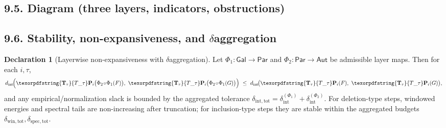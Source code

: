 \documentclass[11pt]{article}
\numberwithin{equation}{section}
\theoremstyle{plain}
\theoremstyle{definition}
\theoremstyle{remark}
\DeclareMathOperator{\Ext}{Ext}
\DeclareRobustCommand{\hyp}{\nobreakdash-}
\newcommand{\Pers}{\mathsf{Pers}}
\newcommand{\Rfun}{\mathcal{R}}
\theoremstyle{plain}
\theoremstyle{definition}
\numberwithin{equation}{section}
\theoremstyle{definition}
\newtheorem{declaration}[theorem]{Declaration}
\DeclareRobustCommand{\Perskft}{\Pers^{\mathrm{cons}}_{k}}
\DeclareRobustCommand{\Ttau}{\texorpdfstring{\ensuremath{\mathbf{T}_{\tau}}}{T\_\tau}}
\DeclareRobustCommand{\Ctau}{\texorpdfstring{\ensuremath{C_{\tau}}}{C\_\tau}}
\DeclareRobustCommand{\muc}{\mu_{\mathrm{Collapse}}}
\DeclareRobustCommand{\nuc}{\nu_{\mathrm{Collapse}}}
\numberwithin{equation}{section}
\theoremstyle{plain}
\theoremstyle{definition}
\theoremstyle{remark}
\providecommand{\Cfun}[1]{\mathsf{C}_{#1}}
\providecommand{\Tfun}[1]{\mathbf{T}_{#1}}
\providecommand{\Ctau}{\Cfun{\tau}}
\providecommand{\Ttau}{\Tfun{\tau}}
\providecommand{\muc}{\mu_{\mathrm{Collapse}}}
\providecommand{\nuc}{\nu_{\mathrm{Collapse}}}
\providecommand{\n}{\unskip\space}
\begin{document}
\subsection*{9.5. Diagram (three layers, indicators, obstructions)}\label{sec:9.5}
\begin{center}
\end{center}

\subsection*{9.6. Stability, non\hyp expansiveness, and \(\delta\)\nobreakdash aggregation}
\begin{declaration}[Layerwise non\hyp expansiveness with \(\delta\)\nobreakdash aggregation]\label{spec:9-delta-agg}
Let \(\Phi_1:\mathsf{Gal}\!\to\!\mathsf{Par}\) and \(\Phi_2:\mathsf{Par}\!\to\!\mathsf{Aut}\) be admissible layer maps.
Then for each \(i,\tau\),
\[
d_{\mathrm{int}}\!\Big(\Ttau\mathbf{P}_i\big(\Phi_2\!\circ\!\Phi_1(F)\big),\ \Ttau\mathbf{P}_i\big(\Phi_2\!\circ\!\Phi_1(G)\big)\Big)\n\ \le\ d_{\mathrm{int}}\!\big(\Ttau\mathbf{P}_i(F),\ \Ttau\mathbf{P}_i(G)\big),
\]
and any empirical/normalization slack is bounded by the aggregated tolerance
\(\delta_{\mathrm{int,tot}}=\delta_{\mathrm{int}}^{(\Phi_1)}+\delta_{\mathrm{int}}^{(\Phi_2)}\).
For deletion\hyp type steps, windowed energies and spectral tails are non\hyp increasing after truncation; for inclusion\hyp type steps they are stable within the aggregated budgets
\(\delta_{\mathrm{win,tot}},\delta_{\mathrm{spec,tot}}\).
\end{declaration}
\end{document}
